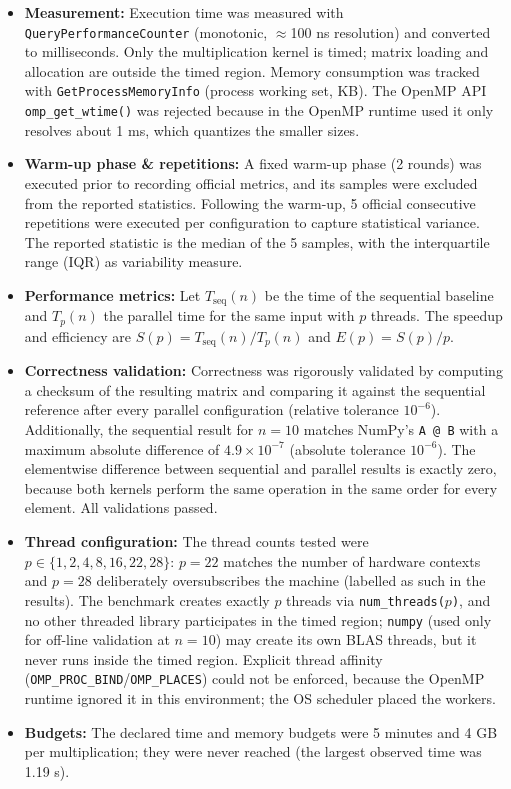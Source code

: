 \documentclass[12pt,a4paper]{article}
\begin{document}
\begin{itemize}
\item \textbf{Measurement:} Execution time was measured with
\texttt{QueryPerformanceCounter} (monotonic, $\approx$100 ns resolution) and
converted to milliseconds. Only the multiplication kernel is timed; matrix
loading and allocation are outside the timed region. Memory consumption was
tracked with \texttt{GetProcessMemoryInfo} (process working set, KB). The
OpenMP API \texttt{omp\_get\_wtime()} was rejected because in the OpenMP
runtime used it only resolves about 1 ms, which quantizes the smaller sizes.
\item \textbf{Warm-up phase \& repetitions:} A fixed warm-up phase
(2 rounds) was executed prior to recording official metrics, and its samples
were excluded from the reported statistics. Following the warm-up, 5
official consecutive repetitions were executed per configuration to capture
statistical variance. The reported statistic is the median of the 5 samples,
with the interquartile range (IQR) as variability measure.
\item \textbf{Performance metrics:} Let $T_{\mathrm{seq}}(n)$ be the time of
the sequential baseline and $T_p(n)$ the parallel time for the same input
with $p$ threads. The speedup and efficiency are
$S(p) = T_{\mathrm{seq}}(n) / T_p(n)$ and $E(p) = S(p) / p$.
\item \textbf{Correctness validation:} Correctness was rigorously validated
by computing a checksum of the resulting matrix and comparing it against the
sequential reference after every parallel configuration (relative tolerance
$10^{-6}$). Additionally, the sequential result for $n = 10$ matches NumPy's
\texttt{A @ B} with a maximum absolute difference of $4.9 \times 10^{-7}$
(absolute tolerance $10^{-6}$). The elementwise difference between
sequential and parallel results is exactly zero, because both kernels
perform the same operation in the same order for every element. All
validations passed.
\item \textbf{Thread configuration:} The thread counts tested were
$p \in \{1, 2, 4, 8, 16, 22, 28\}$: $p = 22$ matches the number of hardware
contexts and $p = 28$ deliberately oversubscribes the machine (labelled as
such in the results). The benchmark creates exactly $p$ threads via
\texttt{num\_threads($p$)}, and no other threaded library participates in
the timed region; \texttt{numpy} (used only for off-line validation at
$n = 10$) may create its own BLAS threads, but it never runs inside the
timed region. Explicit thread affinity
(\texttt{OMP\_PROC\_BIND}/\texttt{OMP\_PLACES}) could not be enforced,
because the OpenMP runtime ignored it in this environment; the OS scheduler
placed the workers.
\item \textbf{Budgets:} The declared time and memory budgets were 5 minutes
and 4 GB per multiplication; they were never reached (the largest observed
time was 1.19 s).
\end{itemize}
\end{document}
